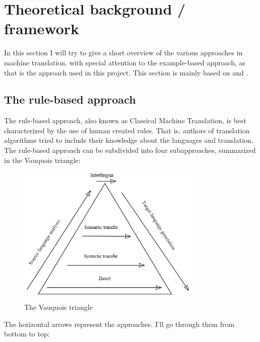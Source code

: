 \documentclass[12pt]{article}
\begin{document}
\section{Theoretical background / framework}

In this section I will try to give a short overview of the various approaches in machine translation, with special attention to the example-based approach, as that is the approach used in this project. This section is mainly based on \citet{jm09} and \citet{vangompel09}.

\subsection{The rule-based approach}

The rule-based approach, also known as Classical Machine Translation, is best characterized by the use of human created rules. That is, authors of translation algorithms tried to include their knowledge about the languages and translation. The rule-based approach can be subdivided into four subapproaches, summarized in the Vauquois triangle: \\

\begin{figure}[htb]
\centering
\includegraphics[width=0.8\textwidth]{vauquois.png}
\caption{The Vauquois triangle}
\label{fig:vauquois}
\end{figure}

The horizontal arrows represent the approaches. I'll go through them from bottom to top:
\end{document}
